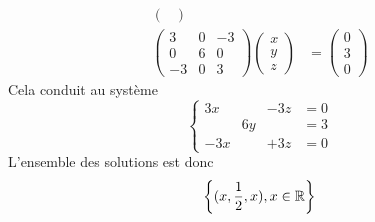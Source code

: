\begin{enumerate}
\begin{align*}
\begin{pmatrix}
 \end{pmatrix}  \\
 \begin{pmatrix}
  3 & 0  & -3 \\
  0 & 6 & 0 \\
-3 & 0 & 3
 \end{pmatrix}
\begin{pmatrix}
 x \\ y \\ z
 \end{pmatrix}
&=\begin{pmatrix}
 0 \\  3 \\ 0
 \end{pmatrix}
\end{align*}
Cela conduit au système
\begin{displaymath}
 \left\lbrace
\begin{aligned}
3x & &-3z &= 0 \\
 & 6y &  &= 3 \\
-3x & &+ 3z &= 0
\end{aligned}
\right. 
\end{displaymath}
L'ensemble des solutions est donc 
\begin{displaymath}
 \left\lbrace (x,\frac{1}{2},x) , x\in \mathbb{R} \right\rbrace 
\end{displaymath}


\end{enumerate}
